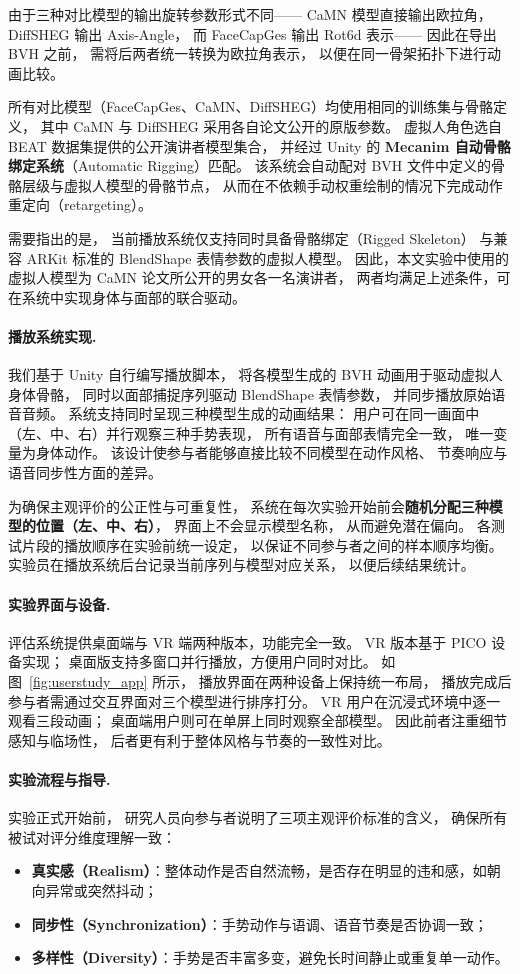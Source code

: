 由于三种对比模型的输出旋转参数形式不同——
CaMN 模型直接输出欧拉角，
DiffSHEG 输出 Axis-Angle，
而 FaceCapGes 输出 Rot6d 表示——
因此在导出 BVH 之前，
需将后两者统一转换为欧拉角表示，
以便在同一骨架拓扑下进行动画比较。

所有对比模型（FaceCapGes、CaMN、DiffSHEG）均使用相同的训练集与骨骼定义，
其中 CaMN 与 DiffSHEG 采用各自论文公开的原版参数。
虚拟人角色选自 BEAT 数据集提供的公开演讲者模型集合，
并经过 Unity 的 \textbf{Mecanim 自动骨骼绑定系统}（Automatic Rigging）匹配。
该系统会自动配对 BVH 文件中定义的骨骼层级与虚拟人模型的骨骼节点，
从而在不依赖手动权重绘制的情况下完成动作重定向（retargeting）。

需要指出的是，
当前播放系统仅支持同时具备骨骼绑定（Rigged Skeleton）
与兼容 ARKit 标准的 BlendShape 表情参数的虚拟人模型。
因此，本文实验中使用的虚拟人模型为 CaMN 论文所公开的男女各一名演讲者，
两者均满足上述条件，可在系统中实现身体与面部的联合驱动。

\paragraph{播放系统实现.}
我们基于 Unity 自行编写播放脚本，
将各模型生成的 BVH 动画用于驱动虚拟人身体骨骼，
同时以面部捕捉序列驱动 BlendShape 表情参数，
并同步播放原始语音音频。
系统支持同时呈现三种模型生成的动画结果：
用户可在同一画面中（左、中、右）并行观察三种手势表现，
所有语音与面部表情完全一致，
唯一变量为身体动作。
该设计使参与者能够直接比较不同模型在动作风格、
节奏响应与语音同步性方面的差异。

为确保主观评价的公正性与可重复性，
系统在每次实验开始前会\textbf{随机分配三种模型的位置（左、中、右）}，
界面上不会显示模型名称，
从而避免潜在偏向。
各测试片段的播放顺序在实验前统一设定，
以保证不同参与者之间的样本顺序均衡。
实验员在播放系统后台记录当前序列与模型对应关系，
以便后续结果统计。

\paragraph{实验界面与设备.}
评估系统提供桌面端与 VR 端两种版本，功能完全一致。
VR 版本基于 PICO 设备实现；
桌面版支持多窗口并行播放，方便用户同时对比。
如图~\ref{fig:userstudy_app} 所示，
播放界面在两种设备上保持统一布局，
播放完成后参与者需通过交互界面对三个模型进行排序打分。
VR 用户在沉浸式环境中逐一观看三段动画；
桌面端用户则可在单屏上同时观察全部模型。
因此前者注重细节感知与临场性，
后者更有利于整体风格与节奏的一致性对比。

\paragraph{实验流程与指导.}
实验正式开始前，
研究人员向参与者说明了三项主观评价标准的含义，
确保所有被试对评分维度理解一致：
\begin{itemize}
    \item \textbf{真实感（Realism）}：整体动作是否自然流畅，是否存在明显的违和感，如朝向异常或突然抖动；
    \item \textbf{同步性（Synchronization）}：手势动作与语调、语音节奏是否协调一致；
    \item \textbf{多样性（Diversity）}：手势是否丰富多变，避免长时间静止或重复单一动作。
\end{itemize}

